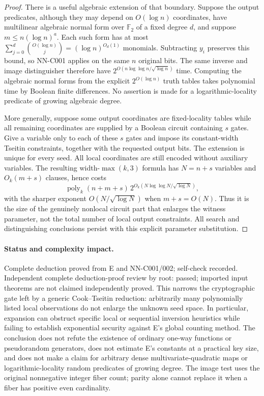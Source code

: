 \begin{proof}
There is a useful algebraic extension of that boundary. Suppose the output predicates, although they may depend on $O(\log n)$ coordinates, have multilinear algebraic normal form over $\mathbb F_2$ of a fixed degree $d$, and suppose $m\leq n(\log n)^a$. Each such form has at most $\sum_{j=0}^{d}\binom{O(\log n)}j=(\log n)^{O_d(1)}$ monomials. Subtracting $y_i$ preserves this bound, so NN-C001 applies on the same $n$ original bits. The same inverse and image distinguisher therefore have $2^{O(n\log\log n/\sqrt{\log n})}$ time. Computing the algebraic normal forms from the explicit $2^{O(\log n)}$ truth tables takes polynomial time by Boolean finite differences. No assertion is made for a logarithmic-locality predicate of growing algebraic degree.

More generally, suppose some output coordinates are fixed-locality tables while all remaining coordinates are supplied by a Boolean circuit containing $s$ gates. Give a variable only to each of these $s$ gates and impose its constant-width Tseitin constraints, together with the requested output bits. The extension is unique for every seed. All local coordinates are still encoded without auxiliary variables. The resulting width-$\max(k,3)$ formula has $N=n+s$ variables and $O_k(m+s)$ clauses, hence costs
\[
 \operatorname{poly}_k(n+m+s)\,
 2^{O_k(N\log\log N/\sqrt{\log N})},
\]
with the sharper exponent $O(N/\sqrt{\log N})$ when $m+s=O(N)$. Thus it is the size of the genuinely nonlocal circuit part that enlarges the witness parameter, not the total number of local output constraints. All search and distinguishing conclusions persist with this explicit parameter substitution.
\end{proof}
\paragraph{Status and complexity impact.}
Complete deduction proved from E and NN-C001/002; self-check recorded. Independent complete deduction-proof review by root: passed; imported input theorems are not claimed independently proved. This narrows the cryptographic gate left by a generic Cook--Tseitin reduction: arbitrarily many polynomially listed local observations do not enlarge the unknown seed space. In particular, expansion can obstruct specific local or sequential inversion heuristics while failing to establish exponential security against E's global counting method. The conclusion does not refute the existence of ordinary one-way functions or pseudorandom generators, does not estimate E's constants at a practical key size, and does not make a claim for arbitrary dense multivariate-quadratic maps or logarithmic-locality random predicates of growing degree. The image test uses the original nonnegative integer fiber count; parity alone cannot replace it when a fiber has positive even cardinality.

